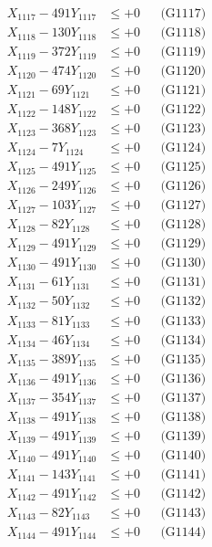 \documentclass[a4paper,10pt]{article}
\begin{document}
{\begin{align}
X_{1117} - 491Y_{1117} &\leq +0 && \text{(G1117)} \\
X_{1118} - 130Y_{1118} &\leq +0 && \text{(G1118)} \\
X_{1119} - 372Y_{1119} &\leq +0 && \text{(G1119)} \\
X_{1120} - 474Y_{1120} &\leq +0 && \text{(G1120)} \\
\allowbreak
X_{1121} - 69Y_{1121} &\leq +0 && \text{(G1121)} \\
X_{1122} - 148Y_{1122} &\leq +0 && \text{(G1122)} \\
X_{1123} - 368Y_{1123} &\leq +0 && \text{(G1123)} \\
X_{1124} - 7Y_{1124} &\leq +0 && \text{(G1124)} \\
X_{1125} - 491Y_{1125} &\leq +0 && \text{(G1125)} \\
X_{1126} - 249Y_{1126} &\leq +0 && \text{(G1126)} \\
X_{1127} - 103Y_{1127} &\leq +0 && \text{(G1127)} \\
X_{1128} - 82Y_{1128} &\leq +0 && \text{(G1128)} \\
X_{1129} - 491Y_{1129} &\leq +0 && \text{(G1129)} \\
X_{1130} - 491Y_{1130} &\leq +0 && \text{(G1130)} \\
\allowbreak
X_{1131} - 61Y_{1131} &\leq +0 && \text{(G1131)} \\
X_{1132} - 50Y_{1132} &\leq +0 && \text{(G1132)} \\
X_{1133} - 81Y_{1133} &\leq +0 && \text{(G1133)} \\
X_{1134} - 46Y_{1134} &\leq +0 && \text{(G1134)} \\
X_{1135} - 389Y_{1135} &\leq +0 && \text{(G1135)} \\
X_{1136} - 491Y_{1136} &\leq +0 && \text{(G1136)} \\
X_{1137} - 354Y_{1137} &\leq +0 && \text{(G1137)} \\
X_{1138} - 491Y_{1138} &\leq +0 && \text{(G1138)} \\
X_{1139} - 491Y_{1139} &\leq +0 && \text{(G1139)} \\
X_{1140} - 491Y_{1140} &\leq +0 && \text{(G1140)} \\
\allowbreak
X_{1141} - 143Y_{1141} &\leq +0 && \text{(G1141)} \\
X_{1142} - 491Y_{1142} &\leq +0 && \text{(G1142)} \\
X_{1143} - 82Y_{1143} &\leq +0 && \text{(G1143)} \\
X_{1144} - 491Y_{1144} &\leq +0 && \text{(G1144)} \\

\end{align}}
\end{document}
